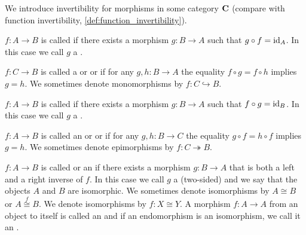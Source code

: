 \begin{definition}\label{def:morphism_invertibility}
  We introduce invertibility for morphisms in some category $\operatorname{\mathbf{C}}$ (compare with function invertibility, \cref{def:function_invertibility}).

  \begin{defenum}
    \item\label{def:morphism_invertibility/left_invertible} $f: A \to B$ is called  if there exists a morphism $g: B \to A$ such that $g \circ f = \operatorname{id}_A$. In this case we call $g$ a .

    \item\label{def:morphism_invertibility/monomorphism} $f: C \to B$ is called a  or  or  if for any $g, h: B \to A$ the equality $f \circ g = f \circ h$ implies $g = h$. We sometimes denote monomorphisms by $f: C \hookrightarrow B$.

    \item\label{def:morphism_invertibility/right_invertible} $f: A \to B$ is called  if there exists a morphism $g: B \to A$ such that $f \circ g = \operatorname{id}_B$. In this case we call $g$ a .

    \item\label{def:morphism_invertibility/epimorphism} $f: A \to B$ is called an  or  or  if for any $g, h: B \to C$ the equality $g \circ f = h \circ f$ implies $g = h$. We sometimes denote epimorphisms by $f: C \twoheadrightarrow B$.

    \item\label{def:morphism_invertibility/isomorphism} $f: A \to B$ is called  or an  if there exists a morphism $g: B \to A$ that is both a left and a right inverse of $f$. In this case we call $g$ a (two-sided)  and we say that the objects $A$ and $B$ are isomorphic. We sometimes denote isomorphisms by $A \cong B$ or $A \overset f \cong B$. We denote isomorphisms by $f: X \cong Y$. A morphism $f: A \to A$ from an object to itself is called an  and if an endomorphism is an isomorphism, we call it an .
  \end{defenum}
\end{definition}

